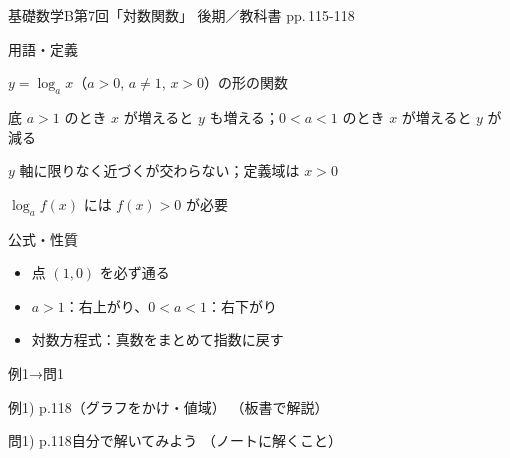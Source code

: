 \documentclass[aspectratio=43,professionalfonts,handout]{beamer}
\newcommand{\LectureNum}{7}
\newcommand{\LectureTitle}{対数関数}
\newcommand{\TextPages}{pp.\,115-118}
\newcommand{\CourseName}{基礎数学B}
\renewcommand{\TermName}{後期}
\begin{document}
\begin{frame}{\CourseName\quad 第\LectureNum 回「\LectureTitle 」}
  {\small \TermName\quad \TeacherName\quad ／\quad 教科書 \TextPages}

  \begin{block}{用語・定義}
  \begin{description}[labelwidth=5.5em]
    \item[\kw{対数関数：$y = \log_a x$}] $y = \log_a x$（$a > 0$, $a \neq 1$, $x > 0$）の形の関数
    \item[\kw{単調増加（$a > 1$）・単調減少（$0 < a < 1$）}] 底 $a > 1$ のとき $x$ が増えると $y$ も増える；$0 < a < 1$ のとき $x$ が増えると $y$ が減る
    \item[\kw{漸近線：$x = 0$（$y$ 軸）}] $y$ 軸に限りなく近づくが交わらない；定義域は $x > 0$
    \item[\kw{真数条件の重要性}] $\log_a f(x)$ には $f(x) > 0$ が必要
  \end{description}
  \end{block}
\end{frame}

\begin{frame}{公式・性質}
  \begin{block}{}
  \begin{itemize}
    \item 点 $(1, 0)$ を必ず通る
    \item $a > 1$：右上がり、$0 < a < 1$：右下がり
    \item 対数方程式：真数をまとめて指数に戻す
  \end{itemize}
  \end{block}
\end{frame}

\begin{frame}{例1→問1}
  \begin{exampleblock}{例1) p.118（グラフをかけ・値域）}
    （板書で解説）
  \end{exampleblock}

  \vfill

  \begin{block}{問1) p.118\quad 自分で解いてみよう}
    （ノートに解くこと）
  \end{block}
\end{frame}
\end{document}
